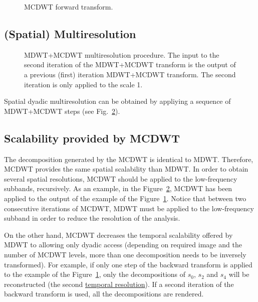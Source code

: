 \begin{figure}
  \centering %
  \caption{MCDWT forward transform.} %
  \label{fig:forward_MCDWT}
\end{figure}




\subsection{(Spatial) Multiresolution}

\begin{figure}
  \centering %
  \caption{MDWT+MCDWT multiresolution procedure. The input to the
    second iteration of the MDWT+MCDWT transform is the output of a
    previous (first) iteration MDWT+MCDWT transform. The second
    iteration is only applied to the scale 1.} %
  \label{fig:multiresolution}
\end{figure}

Spatial dyadic multiresolution can be obtained by appliying a sequence
of MDWT+MCDWT steps (see Fig.~\ref{fig:multiresolution}).

\subsection{Scalability provided by MCDWT}
The decomposition generated by the MCDWT is identical to
MDWT. Therefore, MCDWT provides the same spatial scalability than
MDWT. In order to obtain several spatial resolutions, MCDWT should be
applied to the low-frequency subbands, recursively. As an example, in
the Figure~\ref{fig:multiresolution}, MCDWT has been applied to the
output of the example of the Figure~\ref{fig:forward_MCDWT}. Notice
that between two consecutive iterations of MCDWT, MDWT must be applied
to the low-frequency subband in order to reduce the resolution of the
analysis.

On the other hand, MCDWT decreases the temporal scalability offered by
MDWT to allowing only dyadic access (depending on required image and
the number of MCDWT levels, more than one decomposition needs to be
inversely transformed). For example, if only one step of the backward
transform is applied to the example of the
Figure~\ref{fig:forward_MCDWT}, only the decompositions of $s_0$,
$s_2$ and $s_4$ will be reconstructed (the second
\href{https://en.wikipedia.org/wiki/Temporal_resolution}{temporal
  resolution}). If a second iteration of the backward transform is
used, all the decompositions are rendered.

